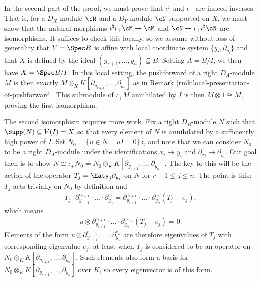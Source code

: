 \begin{prf}
	In the second part of the proof, we must prove that $\iota^\natural$ and $\iota_+$ are indeed inverses. That is, for a $D_X$-module $\cM$ and a $D_Y$-module $\cN$ supported on $X$, we must show that the natural morphisms $\iota^\natural\iota_+\cM\to \cM$ and $\cN\to \iota_+\iota^\natural\cN$ are isomorphisms. It suffices to check this locally, so we assume without loss of generality that $Y = \Spec B$ is affine with local coordinate system $\{y_i,\partial_{y_i}\}$ and that $X$ is defined by the ideal $(y_{r+1},...,y_n)\subseteq B$. Setting $A = B/I$, we then have $X = \Spec B/I$. In this local setting, the pushforward of a right $D_{A}$-module $M$ is then exactly $M\otimes_K K[\partial_{y_{r+1}},...,\partial_{y_n}]$ as in Remark \ref{rmk:local-presentation-of-pushforward}. This submodule of $\iota_+M$ annihilated by $I$ is then $M\otimes 1 \cong M$, proving the first isomorphism.

	The second isomorphism requires more work. Fix a right $D_{B}$-module $N$ such that $\Supp(N)\subseteq V(I) = X$ so that every element of $N$ is annihilated by a sufficiently high power of $I$. Set $N_0 = \{u \in N ~\mid~ uI = 0\}$k, and note that we can consider $N_0$ to be a right $D_{A}$-module under the identifications $x_i\mapsto y_i$ and $\partial_{x_i}\mapsto \partial_{y_i}$. Our goal then is to show $N\cong \iota_+N_0 = N_0\otimes_K K[\partial_{y_{r+1}},...,\partial_{y_n}]$. The key to this will be the action of the operator $T_j = \haty_j\partial_{y_j}$ on $N$ for $r+1\leq j\leq n$. The point is this: $T_j$ acts trivially on $N_0$ by definition and
	\begin{align*}
		T_j\cdot \partial_{y_{r+1}}^{e_{r+1}}\cdot...\cdot \partial_{y_{n}}^{e_{n}} = \partial_{y_{r+1}}^{e_{r+1}}\cdot...\cdot \partial_{y_{n}}^{e_{n}}(T_j - e_j),
	\end{align*}
	which means
	\begin{align*}
		u\otimes \partial_{y_{r+1}}^{e_{r+1}}\cdot...\cdot \partial_{y_{n}}^{e_{n}}\cdot (T_j - e_j) = 0.
	\end{align*}
    Elements of the form $u\otimes \partial_{y_{r+1}}^{e_{r+1}}\cdot...\cdot \partial_{y_{n}}^{e_{n}}$ are therefore eigenvalues of $T_j$ with corresponding eigenvalue $e_j$, at least when $T_j$ is considered to be an operator on $N_0\otimes_K K[\partial_{y_{r+1}},...,\partial_{y_n}]$. Such elements also form a basis for $N_0\otimes_K K[\partial_{y_{r+1}},...,\partial_{y_n}]$ over $K$, so every eigenvector is of this form. 


\end{prf}
